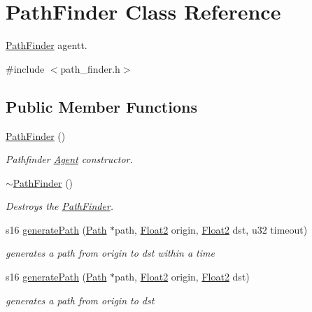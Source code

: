 \hypertarget{class_path_finder}{}\section{Path\+Finder Class Reference}
\label{class_path_finder}


\mbox{\hyperlink{class_path_finder}{Path\+Finder}} agentt.  




{\ttfamily \#include $<$path\+\_\+finder.\+h$>$}

\subsection*{Public Member Functions}
\begin{DoxyCompactItemize}
\item 
\mbox{\hyperlink{class_path_finder_a0761f248c1ebaacf3e47a4021ca25256}{Path\+Finder}} ()
\begin{DoxyCompactList}\small\item\em Pathfinder \mbox{\hyperlink{class_agent}{Agent}} constructor. \end{DoxyCompactList}\item 
\mbox{\hyperlink{class_path_finder_acc04bc8bcddfda54da6a2905b256cf90}{$\sim$\+Path\+Finder}} ()
\begin{DoxyCompactList}\small\item\em Destroys the \mbox{\hyperlink{class_path_finder}{Path\+Finder}}. \end{DoxyCompactList}\item 
s16 \mbox{\hyperlink{class_path_finder_ae1c25582d9f8c1ee73d5adc780a14e9c}{generate\+Path}} (\mbox{\hyperlink{class_path}{Path}} $\ast$path, \mbox{\hyperlink{class_float2}{Float2}} origin, \mbox{\hyperlink{class_float2}{Float2}} dst, u32 timeout)
\begin{DoxyCompactList}\small\item\em generates a path from origin to dst within a time \end{DoxyCompactList}\item 
s16 \mbox{\hyperlink{class_path_finder_a05e232f67bd66be0ef2b56c455dd1425}{generate\+Path}} (\mbox{\hyperlink{class_path}{Path}} $\ast$path, \mbox{\hyperlink{class_float2}{Float2}} origin, \mbox{\hyperlink{class_float2}{Float2}} dst)
\begin{DoxyCompactList}\small\item\em generates a path from origin to dst \end{DoxyCompactList}\item 

\end{DoxyCompactItemize}
